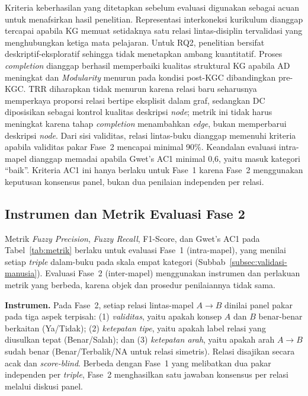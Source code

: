 \documentclass[../../thesis]{subfiles}
\begin{document}
Kriteria keberhasilan yang ditetapkan sebelum evaluasi digunakan sebagai acuan
untuk menafsirkan hasil penelitian. Representasi interkoneksi kurikulum dianggap
tercapai apabila KG memuat setidaknya satu relasi lintas-disiplin tervalidasi
yang menghubungkan ketiga mata pelajaran. Untuk RQ2, penelitian bersifat
deskriptif-eksploratif sehingga tidak menetapkan ambang kuantitatif. Proses
\textit{completion} dianggap berhasil memperbaiki kualitas struktural KG apabila
AD meningkat dan \textit{Modularity} menurun pada kondisi post-KGC dibandingkan
pre-KGC. TRR diharapkan tidak menurun karena relasi baru seharusnya memperkaya
proporsi relasi bertipe eksplisit dalam graf, sedangkan DC diposisikan sebagai
kontrol kualitas deskripsi \textit{node}; metrik ini tidak harus meningkat
karena tahap \textit{completion} menambahkan \textit{edge}, bukan memperbarui
deskripsi \textit{node}. Dari sisi validitas, relasi lintas-buku dianggap
memenuhi kriteria apabila validitas pakar Fase~2 mencapai minimal 90\%.
Keandalan evaluasi intra-mapel dianggap memadai apabila Gwet's AC1 minimal
0{,}6, yaitu masuk kategori ``baik''. Kriteria AC1 ini hanya berlaku untuk
Fase~1 karena Fase~2 menggunakan keputusan konsensus panel, bukan dua penilaian
independen per relasi.

\subsection{Instrumen dan Metrik Evaluasi Fase 2}\label{subsec:metrik-fase2}

Metrik \textit{Fuzzy Precision}, \textit{Fuzzy Recall}, F1-Score, dan Gwet's AC1 pada
Tabel~\ref{tab:metrik} berlaku untuk evaluasi Fase~1 (intra-mapel), yang menilai
setiap \textit{triple} dalam-buku pada skala empat kategori
(Subbab~\ref{subsec:validasi-manusia}). Evaluasi Fase~2 (inter-mapel)
menggunakan instrumen dan perlakuan metrik yang berbeda, karena objek dan
prosedur penilaiannya tidak sama.

\textbf{Instrumen.} Pada Fase~2, setiap relasi lintas-mapel $A \to B$ dinilai
panel pakar pada tiga aspek terpisah: (1) \textit{validitas}, yaitu apakah konsep
$A$ dan $B$ benar-benar berkaitan (Ya/Tidak); (2) \textit{ketepatan tipe}, yaitu
apakah label relasi yang diusulkan tepat (Benar/Salah); dan (3)
\textit{ketepatan arah}, yaitu apakah arah $A \to B$ sudah benar
(Benar/Terbalik/NA untuk relasi simetris). Relasi disajikan secara acak dan
\textit{score-blind}. Berbeda dengan Fase~1 yang melibatkan dua pakar
independen per \textit{triple}, Fase~2 menghasilkan satu jawaban konsensus per
relasi melalui diskusi panel.
\end{document}

